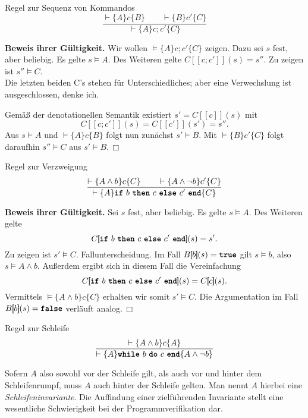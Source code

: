 \documentclass[8pt,fleqn,aspectratio=169]{beamer}
\newcommand{\strong}[1]{\textsf{\textbf{#1}}}
\renewcommand{\qedsymbol}{\ensuremath{\Box}}
\newcommand{\parspace}{\vspace{0.8em}}
\newcommand{\kw}[1]{\textbf{\texttt{#1}}}
\newcommand{\qb}[1]{[\!\![#1]\!\!]}
\begin{document}
\begin{frame}
\begin{block}{Regel zur Sequenz von Kommandos}
\[\dfrac{\vdash\{A\}c\{B\}\qquad \vdash\{B\}c'\{C\}}{\vdash\{A\}c; c'\{C\}}\]
\end{block}\pause
\strong{Beweis ihrer Gültigkeit.} Wir wollen $\models\{A\} c; c'\{C\}$ zeigen.
Dazu sei $s$ fest, aber beliebig. Es gelte $s\models A$. Des Weiteren
gelte $C\qb{c;c'}(s)=s''$. Zu zeigen ist $s''\models C$.\\
{\footnotesize Die letzten beiden C's stehen für Unterschiedliches; aber eine
Verwechslung ist ausgeschlossen, denke ich.}\pause

\parspace
Gemäß der denotationellen Semantik existiert $s'=C\qb{c}(s)$ mit
\[C\qb{c;c'}(s) = C\qb{c'}(s')=s''.\]
Aus $s\models A$ und $\models\{A\}c\{B\}$ folgt nun zunächst $s'\models B$.
Mit $\models\{B\}c'\{C\}$ folgt daraufhin $s''\models C$ aus
$s'\models B$.\,\qedsymbol
\end{frame}

\begin{frame}
\begin{block}{Regel zur Verzweigung}
\[\dfrac{\vdash\{A\land b\}c\{C\}\qquad\vdash\{A\land\lnot b\}c'\{C\}}{
\vdash\{A\}\text{\kw{if} $b$ \kw{then} $c$ \kw{else} $c'$ \kw{end}}\{C\}}\]
\end{block}\pause
\strong{Beweis ihrer Gültigkeit.} Sei $s$ fest, aber beliebig.
Es gelte $s\models A$. Des Weiteren gelte
\[C\qb{\text{\kw{if} $b$ \kw{then} $c$ \kw{else} $c'$ \kw{end}}}(s) = s'.\]
Zu zeigen ist $s'\models C$.\pause{} Fallunterscheidung. Im Fall
$B\qb{b}(s)=\kw{true}$ gilt $s\models b$, also $s\models A\land b$.
Außerdem ergibt sich in diesem Fall die Vereinfachung
\[C\qb{\text{\kw{if} $b$ \kw{then} $c$ \kw{else} $c'$ \kw{end}}}(s) = C\qb{c}(s).\]
Vermittels $\models\{A\land b\}c\{C\}$ erhalten wir somit $s'\models C$.
Die Argumentation im Fall $B\qb{b}(s)=\kw{false}$ verläuft analog.\,\qedsymbol
\end{frame}

\begin{frame}
\begin{block}{Regel zur Schleife}
\[\dfrac{\vdash\{A\land b\}c\{A\}}{
\vdash\{A\}\text{\kw{while} $b$ \kw{do} $c$ \kw{end}}\{A\land\lnot b\}}\]
\end{block}\pause
Sofern $A$ also sowohl vor der Schleife gilt, als auch vor und hinter
dem Schleifenrumpf, muss $A$ auch hinter der Schleife gelten. Man nennt
$A$ hierbei eine \emph{Schleifeninvariante}. Die Auffindung einer
zielführenden Invariante stellt eine wesentliche Schwierigkeit bei der
Programmverifikation dar.
\end{frame}
\end{document}

